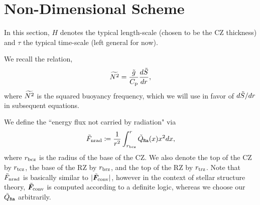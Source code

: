 \documentclass[12pt]{article}
\numberwithin{equation}{section}
\begin{document}
	
	

	
	
	\section{Non-Dimensional Scheme}\label{sec:ndscheme}
	In this section, $H$ denotes the typical length-scale (chosen to be the CZ thickness) and $\tau$ the typical time-scale (left general for now). 
	
	We recall the relation,
	\begin{align}
	\widetilde{N^2} = \frac{\tilde{g}}{C_{\rm{p}}}\frac{d\tilde{S}}{dr},
	\end{align}
	where $\widetilde{N^2}$ is the squared buoyancy frequency, which we will use in favor of $d\tilde{S}/dr$ in subsequent equations.
	
	We define the ``energy flux not carried by radiation" via
	\begin{align}
		\tilde{F}_{\rm nrad} \coloneqq \frac{1}{r^2}\int_{r_{\rm bcz}}^r\tilde{Q}_{\texttt{Ra}}(x)x^2dx,
	\end{align}
	where $r_{\rm bcz}$ is the radius of the base of the CZ. We also denote the top of the CZ by $r_{\rm tcz}$, the base of the RZ by $r_{\rm brz}$, and the top of the RZ by $r_{\rm trz}$. Note that $\tilde{F}_{\rm nrad}$ is basically similar to $|\tilde{\bm{F}}_{\rm conv}|$, however in the context of stellar structure theory, $\tilde{\bm{F}}_{\rm conv}$ is computed according to a definite logic, whereas we choose our $\tilde{Q}_{\texttt{Ra}}$ arbitrarily.
	
\end{document}
